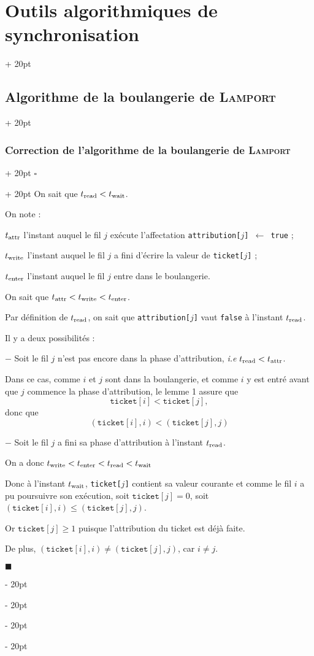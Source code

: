 \documentclass[a4paper, 12pt, twoside]{article}
\renewcommand{\le}{\leqslant}
\renewcommand{\ge}{\geqslant}
\newcommand{\ind}[1][20pt]{\advance\leftskip + #1}
\newcommand{\deind}[1][20pt]{\advance\leftskip - #1}
\newenvironment{indt}[2][20pt]{#2 \par \ind[#1]}{\par \deind} %
\newenvironment{proof}[1][{}]{\begin{indt}{$\square$ #1}}{$\blacksquare$ \end{indt}}
\begin{document}
\begin{indt}{\section{Outils algorithmiques de synchronisation}}
\begin{indt}{\subsection{Algorithme de la boulangerie de \textsc{Lamport}}}
\begin{indt}{\subsubsection{Correction de l'algorithme de la boulangerie de \textsc{Lamport}}}
\begin{proof}
                    On sait que $t_{\rm read} < t_{\rm wait}$.

                    On note :

                    $t_{\rm attr}$ l'instant auquel le fil $j$ exécute l'affectation \texttt{attribution[$j$] $\leftarrow$ true} ;

                    $t_{\rm write}$ l'instant auquel le fil $j$ a fini d'écrire la valeur de \texttt{ticket[$j$]} ;

                    $t_{\rm enter}$ l'instant auquel le fil $j$ entre dans le boulangerie.

                    \vspace{6pt}
                    
                    On sait que $t_{\rm attr} < t_{\rm write} < t_{\rm enter}$.

                    Par définition de $t_{\rm read}$, on sait que \texttt{attribution[$j$]} vaut \texttt{false} à l'instant $t_{\rm read}$.

                    Il y a deux possibilités :

                    $-$ Soit le fil $j$ n'est pas encore dans la phase d'attribution, \textit{i.e} $t_{\rm read} < t_{\rm attr}$.

                    Dans ce cas, comme $i$ et $j$ sont dans la boulangerie, et comme $i$ y est entré avant que $j$ commence la phase d'attribution, le lemme 1 assure que
                    \[
                        \mathtt{ticket}[i] < \mathtt{ticket}[j],
                    \]
                    donc que
                    \[
                        (\mathtt{ticket}[i], i) < (\mathtt{ticket}[j], j)
                    \]

                    $-$ Soit le fil $j$ a fini sa phase d'attribution à l'instant $t_{\rm read}$.

                    On a donc $t_{\rm write} < t_{\rm enter} < t_{\rm read} < t_{\rm wait}$

                    Donc à l'instant $t_{\rm wait}$, \texttt{ticket[$j$]} contient sa valeur courante et comme le fil $i$ a pu poursuivre son exécution, soit $\mathtt{ticket}[j] = 0$, soit $(\mathtt{ticket}[i], i) \le (\mathtt{ticket}[j], j)$.

                    Or $\mathtt{ticket}[j] \ge 1$ puisque l'attribution du ticket est déjà faite.

                    De plus, $(\mathtt{ticket}[i], i) \neq (\mathtt{ticket}[j], j)$, car $i \neq j$.


\end{proof}
\end{indt}
\end{indt}
\end{indt}
\end{document}
